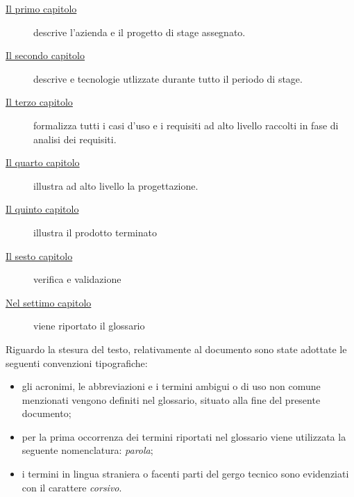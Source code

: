 \begin{description}
	\item[{\hyperref[cap:introduzione]{Il primo capitolo}}] descrive l’azienda e il progetto di stage assegnato.
	
	\item[{\hyperref[cap:Tecnologie utilizzate]{Il secondo capitolo}}] descrive e tecnologie utlizzate durante
	tutto il periodo di stage.
	
	\item[{\hyperref[cap:descrizione-stage]{Il terzo capitolo}}] formalizza tutti i casi d’uso e i requisiti ad alto livello raccolti in fase di
	analisi dei requisiti.
	
	\item[{\hyperref[cap:analisi-requisiti]{Il quarto capitolo}}] illustra ad alto livello la progettazione.
	
	\item[{\hyperref[cap:progettazione-codifica]{Il quinto capitolo}}] illustra il prodotto terminato
	
	\item[{\hyperref[cap:verifica-validazione]{Il sesto capitolo}}] verifica e validazione
	
	\item[{\hyperref[cap:conclusioni]{Nel settimo capitolo}}] viene riportato il glossario
\end{description}
Riguardo la stesura del testo, relativamente al documento sono state adottate le seguenti convenzioni tipografiche:
\begin{itemize}
	\item gli acronimi, le abbreviazioni e i termini ambigui o di uso non comune menzionati vengono definiti nel glossario, situato alla fine del presente documento;
	\item per la prima occorrenza dei termini riportati nel glossario viene utilizzata la seguente nomenclatura: \emph{parola}\glsfirstoccur;
	\item i termini in lingua straniera o facenti parti del gergo tecnico sono evidenziati con il carattere \emph{corsivo}.
\end{itemize}
\endgroup			

\vfill

